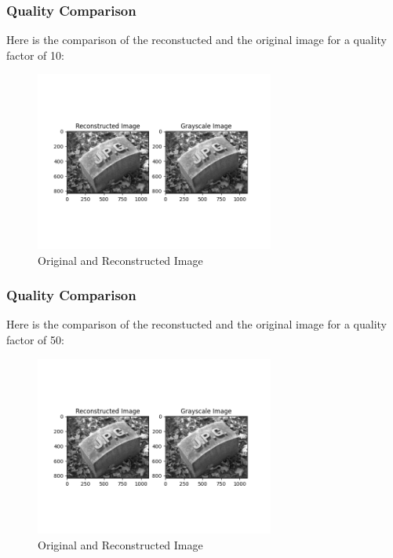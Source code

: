 \documentclass[Serif, 10pt, brown]{beamer}
\theoremstyle{example}
\theoremstyle{plain}
\begin{document}
\begin{frame}
	\frametitle{Quality Comparison}
	Here is the comparison of the reconstucted and the original image for a quality factor of 10:
	\begin{figure}
		\centering
		\includegraphics[width=0.7\textwidth]{../results/Quality: 10_comparison.png}
		\caption{Original and Reconstructed Image}
	\end{figure}
\end{frame}

\begin{frame}
	\frametitle{Quality Comparison}
	Here is the comparison of the reconstucted and the original image for a quality factor of 50:
	\begin{figure}
		\centering
		\includegraphics[width=0.7\textwidth]{../results/Quality: 50_comparison.png}
		\caption{Original and Reconstructed Image}
	\end{figure}
\end{frame}
\end{document}
